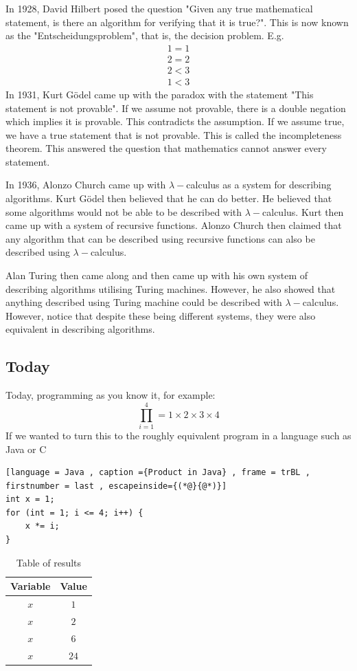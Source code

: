 \documentclass[a4paper]{article}
\theoremstyle{plain}
\theoremstyle{definition}
\theoremstyle{remark}
\begin{document}
	In 1928, David Hilbert posed the question "Given any true mathematical statement, is there an algorithm for verifying that it is true?". This is now known as the "Entscheidungsproblem", that is, the decision problem. E.g.
	\begin{align*}
		1 = 1 \\
		2 = 2 \\
		2 < 3 \\
		1 < 3
	\end{align*}
In 1931, Kurt Gödel came up with the paradox with the statement "This statement is not provable". If we assume not provable, there is a double negation which implies it is provable. This contradicts the assumption. If we assume true, we have a true statement that is not provable. This is called the incompleteness theorem. This answered the question that mathematics cannot answer every statement.\\
\begin{flushleft}
In 1936, Alonzo Church came up with $\lambda-$calculus as a system for describing algorithms. Kurt Gödel then believed that he can do better. He believed that some algorithms would not be able to be described with $\lambda-$calculus. Kurt then came up with a system of recursive functions. Alonzo Church then claimed that any algorithm that can be described using recursive functions can also be described using $\lambda-$calculus.  \\ 
\end{flushleft}
\begin{flushleft}
Alan Turing then came along and then came up with his own system of describing algorithms utilising Turing machines. However, he also showed that anything described using Turing machine could be described with $\lambda-$calculus. However, notice that despite these being different systems, they were also equivalent in describing algorithms. \\
\subsection{Today}

Today, programming as you know it, for example:
\[
\prod_{i=1}^{4} = 1 \times 2 \times 3 \times 4 
\] 
If we wanted to turn this to the roughly equivalent program in a language such as Java or C
\begin{lstlisting}[language = Java , caption ={Product in Java} , frame = trBL , firstnumber = last , escapeinside={(*@}{@*)}]
int x = 1;
for (int = 1; i <= 4; i++) {
	x *= i;
}
\end{lstlisting}
\begin{table}[H]
	\centering
	\caption{Table of results}
	\label{tab:results}
	\begin{tabular}{|c|c|}
		\hline
	Variable & Value \\
	\hline
	$x$ & $1$ \\
	$x$ & $2$ \\
	$x$ & $6$ \\
	$x$ & $24$ \\
	\hline
	\end{tabular}
\end{table}
\end{flushleft}
\end{document}
